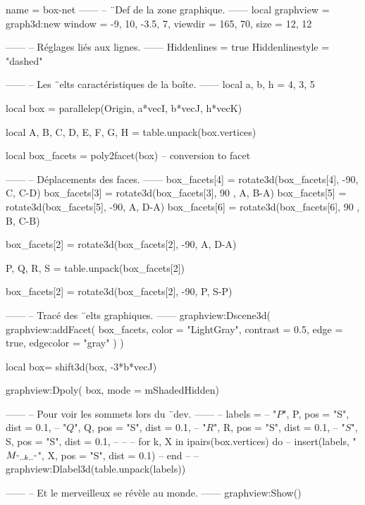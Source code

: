 \documentclass{standalone}
\begin{document}
\begin{luadraw}{name = box-net}
------
-- ¨Def de la zone graphique.
------
local graphview = graph3d:new{
  window  = {-9, 10, -3.5, 7},
  viewdir = {165, 70},
  size    = {12, 12}
}

------
-- Réglages liés aux lignes.
------
Hiddenlines = true
Hiddenlinestyle = "dashed"

------
-- Les ¨elts caractéristiques de la boîte.
------
local a, b, h = 4, 3, 5

local box = parallelep(Origin, a*vecI, b*vecJ, h*vecK)

local A, B, C, D, E, F, G, H = table.unpack(box.vertices)

local box_facets = poly2facet(box) -- conversion to facet

------
-- Déplacements des faces.
------
box_facets[4] = rotate3d(box_facets[4], -90, {C, C-D})
box_facets[3] = rotate3d(box_facets[3], 90 , {A, B-A})
box_facets[5] = rotate3d(box_facets[5], -90, {A, D-A})
box_facets[6] = rotate3d(box_facets[6], 90 , {B, C-B})

box_facets[2] = rotate3d(box_facets[2], -90, {A, D-A})

P, Q, R, S = table.unpack(box_facets[2])

box_facets[2] = rotate3d(box_facets[2], -90, {P, S-P})

------
-- Tracé des ¨elts graphiques.
------
graphview:Dscene3d(
  graphview:addFacet(
    box_facets,
    {
      color     = "LightGray",
      contrast  = 0.5,
      edge      = true,
      edgecolor = "gray"
    })
)

local box= shift3d(box, -3*b*vecJ)

graphview:Dpoly(
    box,
    {mode = mShadedHidden})

------
-- Pour voir les sommets lors du ¨dev.
------
-- labels = {
--   "$P$", P, {pos = "S", dist = 0.1},
--   "$Q$", Q, {pos = "S", dist = 0.1},
--   "$R$", R, {pos = "S", dist = 0.1},
--   "$S$", S, {pos = "S", dist = 0.1},
-- }
--
-- for k, X in ipairs(box.vertices) do
--   insert(labels, {"$M_{".. k .."}$", X, {pos = "S", dist = 0.1}})
-- end
--
-- graphview:Dlabel3d(table.unpack(labels))

------
-- Et le merveilleux se révèle au monde.
------
graphview:Show()
\end{luadraw}
\end{document}
